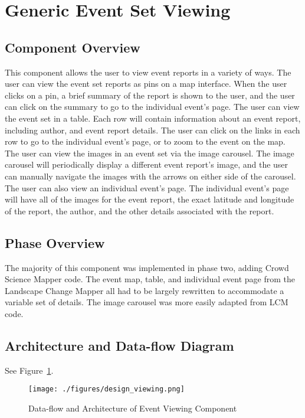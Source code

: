 \section{Generic Event Set Viewing}

\subsection{Component  Overview}
This component allows the user to view event reports in a variety of ways. The user can view the event set reports as pins on a map interface. When the user clicks on a pin, a brief summary of the report is shown to the user, and the user can click on the summary to go to the individual event's page. The user can view the event set in a table. Each row will contain information about an event report, including author, and event report details. The user can click on the links in each row to go to the individual event's page, or to zoom to the event on the map. The user can view the images in an event set via the image carousel. The image carousel will periodically display a different event report's image, and the user can manually navigate the images with the arrows on either side of the carousel. The user can also view an individual event's page. The individual event's page will have all of the images for the event report, the exact latitude and longitude of the report, the author, and the other details associated with the report.

\subsection{Phase Overview}
The majority of this component was implemented in phase two, adding Crowd Science Mapper code. The event map, table, and individual event page from the Landscape Change Mapper all had to be largely rewritten to accommodate a variable set of details. The image carousel was more easily adapted from LCM code.

\subsection{ Architecture and Data-flow Diagram}
See Figure~\ref{design_viewing}.
\begin{figure}[tbh]
\begin{center}
\texttt{[image: ./figures/design\_viewing.png]}
\end{center}
\caption{Data-flow and Architecture of Event Viewing Component \label{design_viewing}}
\end{figure} 

